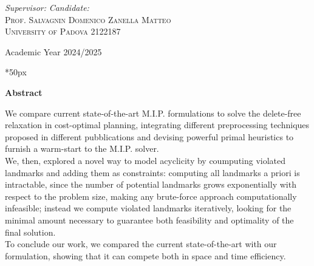 \documentclass[a4paper,twoside,12pt]{report}
\begin{document}
\begin{titlepage}
\begin{center}
\vfill

\textit{\large Supervisor:} \hfill \textit{\large Candidate:}\\
\textsc{\large Prof. Salvagnin Domenico} \hfill \textsc{Zanella Matteo}\\
\textsc{University of Padova} \hfill \textsc{2122187}\\

\vfill

Academic Year 2024/2025

\vfill


\end{center}
\end{titlepage}

\thispagestyle{empty}
\clearpage{\pagestyle{plain}\cleardoublepage}
    
\clearpage\null\newpage

\newcommand\summaryname{Abstract}
\newenvironment{Abstract} {
    \begin{center}%
    \bfseries{\summaryname} \end{center}
}

\vspace*{50px}

\begin{Abstract}
    \begin{center}
        We compare current state-of-the-art M.I.P. formulations to solve the delete-free relaxation in cost-optimal planning, integrating different preprocessing techniques proposed in different pubblications and devising powerful primal heuristics to furnish a warm-start to the M.I.P. solver.\\
        We, then, explored a novel way to model acyclicity by coumputing violated landmarks and adding them as constraints: computing all landmarks a priori is intractable, since the number of potential landmarks grows exponentially with respect to the problem size, making any brute-force approach computationally infeasible; instead we compute violated landmarks iteratively, looking for the minimal amount necessary to guarantee both feasibility and optimality of the final solution.\\
        To conclude our work, we compared the current state-of-the-art with our formulation, showing that it can compete both in space and time efficiency.
    \end{center}
\end{Abstract}
\end{document}
